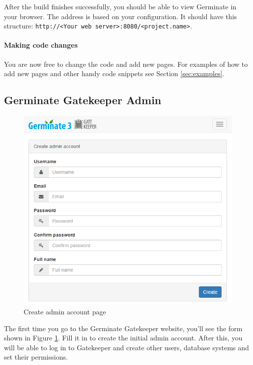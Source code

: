 After the build finishes successfully, you should be able to view Germinate in your browser. The address is based on your configuration. It should have this structure: \texttt{http://<Your web server>:8080/<project.name>}.

\paragraph{Making code changes}
You are now free to change the code and add new pages. For examples of how to add new pages and other handy code snippets see Section \ref{sec:examples}.

\subsection{Germinate Gatekeeper Admin}
\label{subsection:gatekeeper-admin}

\begin{figure}
	\centering
	\includegraphics[scale=0.4]{img/setup/create-admin.png}
	\caption{Create admin account page}
	\label{fig:create-admin}
\end{figure}

The first time you go to the Germinate Gatekeeper website, you'll see the form shown in Figure \ref{fig:create-admin}. Fill it in to create the initial admin account. After this, you will be able to log in to Gatekeeper and create other users, database systems and set their permissions.

